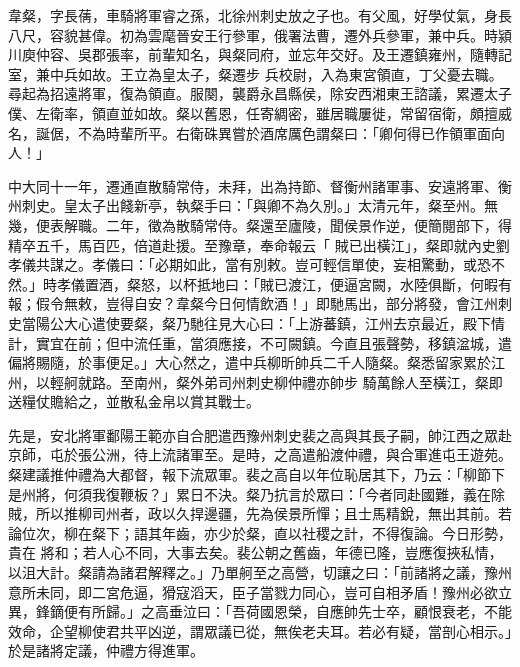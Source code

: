 
\begin{pinyinscope}

 韋粲，字長蒨，車騎將軍睿之孫，北徐州刺史放之子也。有父風，好學仗氣，身長八尺，容貌甚偉。初為雲麾晉安王行參軍，俄署法曹，遷外兵參軍，兼中兵。時潁川庾仲容、吳郡張率，前輩知名，與粲同府，並忘年交好。及王遷鎮雍州，隨轉記室，兼中兵如故。王立為皇太子，粲遷步
 兵校尉，入為東宮領直，丁父憂去職。尋起為招遠將軍，復為領直。服闋，襲爵永昌縣侯，除安西湘東王諮議，累遷太子僕、左衛率，領直並如故。粲以舊恩，任寄綢密，雖居職屢徙，常留宿衛，頗擅威名，誕倨，不為時輩所平。右衛硃異嘗於酒席厲色謂粲曰：「卿何得已作領軍面向人！」



 中大同十一年，遷通直散騎常侍，未拜，出為持節、督衡州諸軍事、安遠將軍、衡州刺史。皇太子出餞新亭，執粲手曰：「與卿不為久別。」太清元年，粲至州。無幾，便表解職。二年，徵為散騎常侍。粲還至廬陵，聞侯景作逆，便簡閱部下，得精卒五千，馬百匹，倍道赴援。至豫章，奉命報云「
 賊已出橫江」，粲即就內史劉孝儀共謀之。孝儀曰：「必期如此，當有別敕。豈可輕信單使，妄相驚動，或恐不然。」時孝儀置酒，粲怒，以杯抵地曰：「賊已渡江，便逼宮闕，水陸俱斷，何暇有報；假令無敕，豈得自安？韋粲今日何情飲酒！」即馳馬出，部分將發，會江州刺史當陽公大心遣使要粲，粲乃馳往見大心曰：「上游蕃鎮，江州去京最近，殿下情計，實宜在前；但中流任重，當須應接，不可闕鎮。今直且張聲勢，移鎮湓城，遣偏將賜隨，於事便足。」大心然之，遣中兵柳昕帥兵二千人隨粲。粲悉留家累於江州，以輕舸就路。至南州，粲外弟司州刺史柳仲禮亦帥步
 騎萬餘人至橫江，粲即送糧仗贍給之，並散私金帛以賞其戰士。



 先是，安北將軍鄱陽王範亦自合肥遣西豫州刺史裴之高與其長子嗣，帥江西之眾赴京師，屯於張公洲，待上流諸軍至。是時，之高遣船渡仲禮，與合軍進屯王遊苑。粲建議推仲禮為大都督，報下流眾軍。裴之高自以年位恥居其下，乃云：「柳節下是州將，何須我復鞭板？」累日不決。粲乃抗言於眾曰：「今者同赴國難，義在除賊，所以推柳司州者，政以久捍邊疆，先為侯景所憚；且士馬精銳，無出其前。若論位次，柳在粲下；語其年齒，亦少於粲，直以社稷之計，不得復論。今日形勢，貴在
 將和；若人心不同，大事去矣。裴公朝之舊齒，年德已隆，豈應復挾私情，以沮大計。粲請為諸君解釋之。」乃單舸至之高營，切讓之曰：「前諸將之議，豫州意所未同，即二宮危逼，猾寇滔天，臣子當戮力同心，豈可自相矛盾！豫州必欲立異，鋒鏑便有所歸。」之高垂泣曰：「吾荷國恩榮，自應帥先士卒，顧恨衰老，不能效命，企望柳使君共平凶逆，謂眾議已從，無俟老夫耳。若必有疑，當剖心相示。」於是諸將定議，仲禮方得進軍。




\end{pinyinscope}
